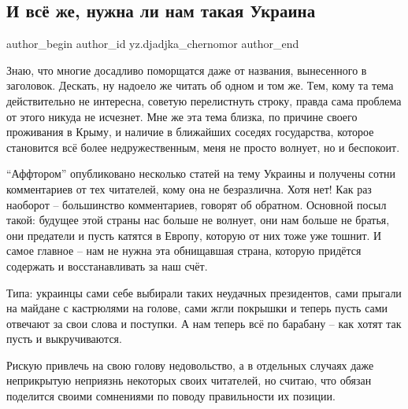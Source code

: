  
 
 
 
 
 
\subsection{И всё же, нужна ли нам такая Украина}
\label{sec:25_12_2021.yz.djadjka_chernomor.1.nuzhna_li_nam_takaja_ukraina}
 
\ifcmt
 author_begin
   author_id yz.djadjka_chernomor
 author_end
\fi

Знаю, что многие досадливо поморщатся даже от названия, вынесенного в
заголовок. Дескать, ну надоело же читать об одном и том же. Тем, кому та тема
действительно не интересна, советую перелистнуть строку, правда сама проблема
от этого никуда не исчезнет. Мне же эта тема близка, по причине своего
проживания в Крыму, и наличие в ближайших соседях государства, которое
становится всё более недружественным, меня не просто волнует, но и беспокоит.


\enquote{Аффтором} опубликовано несколько статей на тему Украины и получены сотни
комментариев от тех читателей, кому она не безразлична. Хотя нет! Как раз
наоборот – большинство комментариев, говорят об обратном. Основной посыл такой:
будущее этой страны нас больше не волнует, они нам больше не братья, они
предатели и пусть катятся в Европу, которую от них тоже уже тошнит. И самое
главное – нам не нужна эта обнищавшая страна, которую придётся содержать и
восстанавливать за наш счёт.

Типа: украинцы сами себе выбирали таких неудачных президентов, сами прыгали на
майдане с кастрюлями на голове, сами жгли покрышки и теперь пусть сами отвечают
за свои слова и поступки. А нам теперь всё по барабану – как хотят так пусть и
выкручиваются.

Рискую привлечь на свою голову недовольство, а в отдельных случаях даже
неприкрытую неприязнь некоторых своих читателей, но считаю, что обязан
поделится своими сомнениями по поводу правильности их позиции.


